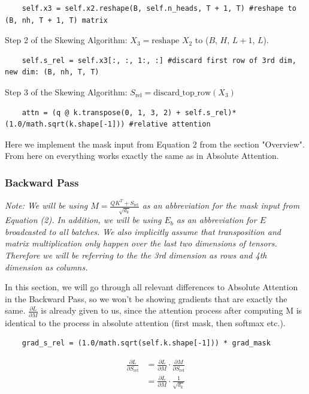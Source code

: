 \documentclass[a4paper,12pt]{extarticle}
\begin{document}
\begin{lstlisting}
    self.x3 = self.x2.reshape(B, self.n_heads, T + 1, T) #reshape to (B, nh, T + 1, T) matrix
\end{lstlisting}
Step 2 of the Skewing Algorithm: \( X_3 = \text{reshape } X_2\) to ($B$, $H$, $L + 1$, $L$). \newline

\begin{lstlisting}
    self.s_rel = self.x3[:, :, 1:, :] #discard first row of 3rd dim, new dim: (B, nh, T, T)
\end{lstlisting}
Step 3 of the Skewing Algorithm: \( S_\text{rel} = \text{discard\_top\_row}(X_3)\)\newline

\begin{lstlisting}
    attn = (q @ k.transpose(0, 1, 3, 2) + self.s_rel)*(1.0/math.sqrt(k.shape[-1])) #relative attention
\end{lstlisting}
Here we implement the mask input from Equation 2 from the section "Overview". From here on everything works exactly the same as in Absolute Attention.


\subsubsection{Backward Pass}
\textit{Note: We will be using $M = \frac{QK^T+S_\text{rel}}{\sqrt{d_k}}$ as an abbreviation for the mask input from Equation (2). In addition, we will be using $E_b$ as an abbreviation for $E$ broadcasted to all batches. We also implicitly assume that transposition and matrix multiplication only happen over the last two dimensions of tensors. Therefore we will be referring to the the 3rd dimension as rows and 4th dimension as columns.}\newline

In this section, we will go through all relevant differences to Absolute Attention in the Backward Pass, so we won't be showing gradients that are exactly the same. $\frac{\partial L}{\partial M}$ is already given to us, since the attention process after computing M is identical to the process in absolute attention (first mask, then softmax etc.).\newline

\begin{lstlisting}
    grad_s_rel = (1.0/math.sqrt(self.k.shape[-1])) * grad_mask
\end{lstlisting}
\begin{align}
\frac{\partial L}{\partial S_\text{rel}}
&= \frac{\partial L}{\partial M} \cdot \frac{\partial M}{\partial S_\text{rel}} \\[0.15cm]
&= \frac{\partial L}{\partial M} \cdot \frac{1}{\sqrt{d_k}}
\end{align}
\end{document}
